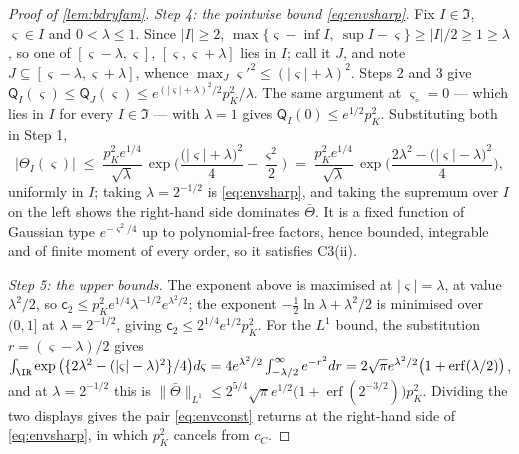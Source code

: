 \begin{proof}[Proof of \cref{lem:bdryfam}]
\emph{Step 4: the pointwise bound \eqref{eq:envsharp}.} Fix $I\in\mathfrak I$, $\varsigma\in I$ and
$0<\lambda\le1$. Since $|I|\ge2$, $\max\{\varsigma-\inf I,\ \sup I-\varsigma\}\ge|I|/2\ge1\ge\lambda$,
so one of $[\varsigma-\lambda,\varsigma]$, $[\varsigma,\varsigma+\lambda]$ lies in $I$; call it $J$, and
note $J\subseteq[\varsigma-\lambda,\varsigma+\lambda]$, whence $\max_{J}\varsigma'^{2}\le(|\varsigma|+\lambda)^{2}$.
Steps 2 and 3 give $\mathsf Q_I(\varsigma)\le\mathsf Q_J(\varsigma)\le
e^{(|\varsigma|+\lambda)^{2}/2}p_K^{2}/\lambda$. The same argument at $\varsigma_\circ=0$ --- which lies
in $I$ for every $I\in\mathfrak I$ --- with $\lambda=1$ gives $\mathsf Q_I(0)\le e^{1/2}p_K^{2}$.
Substituting both in Step 1,
\begin{equation*}
\big|\Theta_I(\varsigma)\big|\;\le\;\frac{p_K^{2}e^{1/4}}{\sqrt\lambda}\,
\exp\Big(\frac{\big(|\varsigma|+\lambda\big)^{2}}{4}-\frac{\varsigma^{2}}{2}\Big)
\;=\;\frac{p_K^{2}e^{1/4}}{\sqrt\lambda}\,
\exp\Big(\frac{2\lambda^{2}-\big(|\varsigma|-\lambda\big)^{2}}{4}\Big),
\end{equation*}
uniformly in $I$; taking $\lambda=2^{-1/2}$ is \eqref{eq:envsharp}, and taking the supremum over $I$ on
the left shows the right-hand side dominates $\bar\Theta$. It is a fixed function of Gaussian type
$e^{-\varsigma^{2}/4}$ up to polynomial-free factors, hence bounded, integrable and of finite moment of
every order, so it satisfies C3(ii).

\emph{Step 5: the upper bounds.} The exponent above is maximised at $|\varsigma|=\lambda$, at value
$\lambda^{2}/2$, so $\mathsf c_2\le p_K^{2}e^{1/4}\lambda^{-1/2}e^{\lambda^{2}/2}$; the exponent
$-\tfrac12\ln\lambda+\lambda^{2}/2$ is minimised over $(0,1]$ at $\lambda=2^{-1/2}$, giving
$\mathsf c_2\le2^{1/4}e^{1/2}p_K^{2}$. For the $L^{1}$ bound, the substitution $r=(\varsigma-\lambda)/2$
gives
$\int_\IR\exp\big(\{2\lambda^{2}-(|\varsigma|-\lambda)^{2}\}/4\big)d\varsigma
=4e^{\lambda^{2}/2}\int_{-\lambda/2}^{\infty}e^{-r^{2}}dr
=2\sqrt\pi e^{\lambda^{2}/2}\big(1+\operatorname{erf}(\lambda/2)\big)$,
and at $\lambda=2^{-1/2}$ this is
$\|\bar\Theta\|_{L^{1}}\le2^{5/4}\sqrt\pi e^{1/2}\big(1+\operatorname{erf}(2^{-3/2})\big)p_K^{2}$.
Dividing the two displays gives the pair \eqref{eq:envconst} returns at the right-hand side of
\eqref{eq:envsharp}, in which $p_K^{2}$ cancels from $c_C$.


\end{proof}
